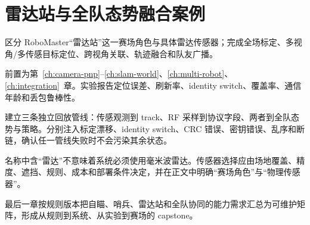 \chapter{雷达站与全队态势融合案例}
\label{ch:radar-case}

\begin{learningobjectives}
区分 RoboMaster“雷达站”这一赛场角色与具体雷达传感器；完成全场标定、多视角/多传感目标定位、跨视角关联、轨迹融合和队友广播。
\end{learningobjectives}

\begin{prerequisites}
前置为第~\ref{ch:camera-pnp}--\ref{ch:slam-world}、\ref{ch:multi-robot}、\ref{ch:integration}~章。实验报告定位误差、刷新率、identity switch、覆盖率、通信年龄和丢包鲁棒性。
\end{prerequisites}


\begin{engineeringcheck}
建立三条独立回放管线：传感观测到 track、RF 采样到协议字段、两者到全队态势与策略。分别注入标定漂移、identity switch、CRC 错误、密钥错误、乱序和断链，确认任一管线失败时不会污染其余状态。
\end{engineeringcheck}

\begin{failuremode}
名称中含“雷达”不意味着系统必须使用毫米波雷达。传感器选择应由场地覆盖、精度、遮挡、规则、成本和部署条件决定，并在正文中明确“赛场角色”与“物理传感器”。
\end{failuremode}

\begin{chaptertransition}
最后一章按规则版本把自瞄、哨兵、雷达站和全队协同的能力需求汇总为可维护矩阵，形成从规则到系统、从实验到赛场的 capstone。
\end{chaptertransition}
